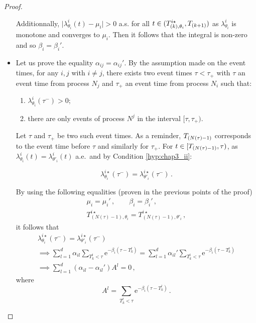 \begin{subappendices}
\begin{proof}
\begin{itemize}
          Additionnally,  $\lvert \lambda_{\theta_i}^i(t) - \mu_i \rvert > 0$ a.s. for all $t\in(T_{(k),\theta_i}^{i\star}, T\park[k+1])$ as $\lambda^i_{\theta_i}$ is monotone and converges to $\mu_i$. Then it follows that the integral is non-zero and so $\beta_i = \beta_i'$.        
      
      \item Let us prove the equality $\alpha_{ij} = \alpha_{ij}'$. 
      By the assumption made on the event times, for any $i,j$ with $i\neq j$, there exists two event times $\tau < \tau_+$ with $\tau$ an event time from process $N_j$ and $\tau_+$ an event time from process $N_i$ such that:
      \begin{enumerate}
          \item $\lambda_{\theta_i}^i(\tau^-) > 0$;
          \item there are only events of process $N^j$ in the interval $[\tau, \tau_+)$.
      \end{enumerate} 
      
      Let $\tau$ and $\tau_+$ be two such event times. 
      As a reminder, $T\park[N(\tau) - 1]$ corresponds to the event time before $\tau$ and similarly for $\tau_+$. 
      For $t \in [T\park[N(\tau) - 1], \tau)$, as $\lambda_{\theta_i}^i(t) = \lambda_{\theta'_i}^i(t)$ a.e.\ and by Condition \ref{hyp:chap3_ii}:
      
      \begin{equation*}
          \lambda_{\theta_i}^{i\star}(\tau^-) = \lambda_{\theta'_i}^{i\star}(\tau^-) \,.
      \end{equation*}
      
      
      By using the following equalities (proven in the previous points of the proof) 
      \begin{gather*}
      \mu_i = {\mu_i}'\,, \qquad \beta_i = \beta_i' \,,\\
      T_{(N(\tau) - 1), \theta_i}^{i\star} = T_{(N(\tau) - 1), \theta'_i}^{i\star}\,,
      \end{gather*} 
      it follows that 
      \begin{gather}
      \lambda_{\theta_i}^{i\star}(\tau^-) = \lambda_{\theta'_i}^{i\star}(\tau^-)\nonumber\\
      \implies \sum_{l=1}^{d}{\alpha_{il}\sum_{T_k^l < \tau}{\mathrm{e}^{-\beta_i(\tau - T_k^l)}}} =\sum_{l=1}^{d}{\alpha_{il}'\sum_{T_k^l < \tau}{\mathrm{e}^{-\beta_i(\tau - T_k^l)}}}\nonumber\\
      \implies \sum_{l=1}^{d}{(\alpha_{il} - \alpha_{il}')A^l}= 0\,,\label{eq:chap3_A^l}
      \end{gather}
      where \[A^l = \sum_{T_k^l < \tau}{\mathrm{e}^{-\beta_i(\tau - T_k^l)}}\,.\]
      

\end{itemize}
\end{proof}
\end{subappendices}
